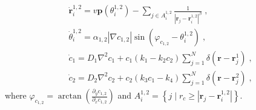 \documentclass{article}
\begin{document}
\begin{subequations}
    \begin{align}
        &\dot{\mathbf{r}}_{i}^{1,2}=v\mathbf{p}\left( \theta _{i}^{1,2} \right) -\sum_{j\in A_{i}^{1,2}}{\frac{1}{| \mathbf{r}_j-\mathbf{r}_{i}^{1,2} |^{\beta}}\;,}\\
        &\dot{\theta}_{i}^{1,2}=\alpha _{1,2}\left| \nabla c_{1,2} \right|\sin \left( \varphi _{c_{1,2}}-\theta _{i}^{1,2} \right) \;,\\
        &\dot{c}_1=D_1\nabla ^2c_1+c_1\left( k_1-k_2c_2 \right) \sum_{j=1}^N{\delta \left( \mathbf{r}-\mathbf{r}_{j}^{1} \right)}\;,\\
        &\dot{c}_2=D_2\nabla ^2c_2+c_2\left( k_3c_1-k_4 \right) \sum_{j=1}^N{\delta \left( \mathbf{r}-\mathbf{r}_{j}^{2} \right)}\;,
    \end{align}
\end{subequations}
where $\varphi _{c_{1,2}}=\arctan \left( \frac{\partial _yc_{1,2}}{\partial _xc_{1,2}} \right) $ and $A_{i}^{1,2}=\left\{ j\mid r_c\geqslant | \mathbf{r}_j-\mathbf{r}_{i}^{1,2} | \right\}$.
\end{document}
